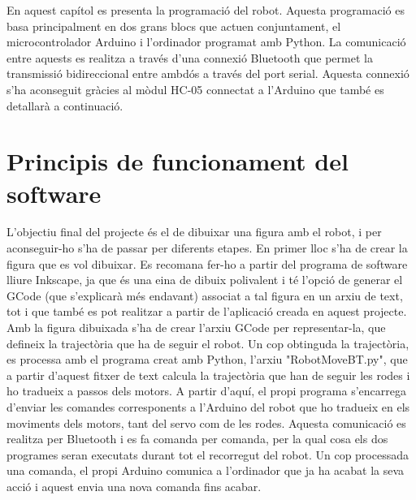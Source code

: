 






En aquest capítol es presenta la programació del robot. Aquesta programació es basa principalment en dos grans blocs que actuen conjuntament, el microcontrolador Arduino i l’ordinador programat amb Python. La comunicació entre aquests es realitza a través d’una connexió Bluetooth que permet la transmissió bidireccional entre ambdós a través del port serial. Aquesta connexió s’ha aconseguit gràcies al mòdul HC-05 connectat a l’Arduino que també es detallarà a continuació.


\section{Principis de funcionament del software}

L’objectiu final del projecte és el de dibuixar una figura amb el robot, i per aconseguir-ho s’ha de passar per diferents etapes. En primer lloc s’ha de crear la figura que es vol dibuixar. Es recomana fer-ho a partir del programa de software lliure Inkscape, ja que és una eina de dibuix polivalent i té l’opció de generar el GCode (que s’explicarà més endavant) associat a tal figura en un arxiu de text, tot i que també es pot realitzar a partir de l’aplicació creada en aquest projecte. Amb la figura dibuixada s’ha de crear l’arxiu GCode per representar-la, que defineix la trajectòria que ha de seguir el robot. Un cop obtinguda la trajectòria, es processa amb el programa creat amb Python, l’arxiu "RobotMoveBT.py", que a partir d’aquest fitxer de text calcula la trajectòria que han de seguir les rodes i ho tradueix a passos dels motors. A partir d’aquí, el propi programa s’encarrega d’enviar les comandes corresponents a l’Arduino del robot que ho tradueix en els moviments dels motors, tant del servo com de les rodes. Aquesta comunicació es realitza per Bluetooth i es fa comanda per comanda, per la qual cosa els dos programes seran  executats durant tot el recorregut del robot. Un cop processada una comanda, el propi Arduino comunica a l'ordinador que ja ha acabat la seva acció i aquest envia una nova comanda fins acabar.


